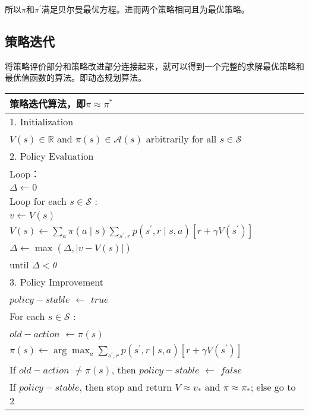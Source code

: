 所以$\pi$和$\pi^{\prime}$满足贝尔曼最优方程。进而两个策略相同且为最优策略。
\subsection{策略迭代}
将策略评价部分和策略改进部分连接起来，就可以得到一个完整的求解最优策略和最优值函数的算法。即动态规划算法。
\begin{table}[htbp]
  \centering
  
    \begin{tabular}{l}	 
	\bottomrule
	\bottomrule
	策略迭代算法，即$\pi \approx \pi^{*}$ \\
    \midrule
	1. Initialization \\
    \quad $V(s) \in \mathbb{R}$ and $\pi(s) \in \mathcal{A}(s)$ arbitrarily for all $s \in \mathcal{S}$ \\
    2. Policy Evaluation \\    
	Loop： \\
        \quad$\Delta \leftarrow 0$ \\
        \quad Loop for each $s \in \mathcal{S}$ : \\
            \quad \quad $v \leftarrow V(s)$  \\
            \quad \quad $V(s) \leftarrow \sum_{a} \pi(a \mid s) \sum_{s^{\prime}, r} p\left(s^{\prime}, r \mid s, a\right)\left[r+\gamma V\left(s^{\prime}\right)\right]$ \\
            \quad \quad $\Delta \leftarrow \max (\Delta,|v-V(s)|)$ \\
    until $\Delta < \theta$ \\
	3. Policy Improvement \\
	\quad $policy-stable$ $\leftarrow$ $true$ \\
	\quad For each $s \in \mathcal{S}$ : \\
	\quad \quad $old-action$ $\leftarrow \pi(s)$ \\
	\quad \quad $\pi(s) \leftarrow \arg \max _{a} \sum_{s^{\prime}, r} p\left(s^{\prime}, r \mid s, a\right)\left[r+\gamma V\left(s^{\prime}\right)\right]$ \\
	\quad \quad If $old-action$ $\neq \pi(s)$, then $policy-stable$ $\leftarrow$ $false$  \\
	\quad If $policy-stable$, then stop and return $V \approx v_{*}$ and $\pi \approx \pi_{*}$; else go to 2 \\
    \bottomrule
	\bottomrule
	\end{tabular}%
  \label{algorithm1}%
\end{table}%


